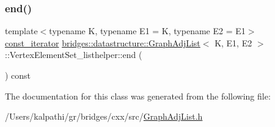 \mbox{\label{classbridges_1_1datastructure_1_1_graph_adj_list_1_1_vertex_element_set__listhelper_ade98a69d94c58ec30a24f0ed802fe672}} 
\subsubsection{\texorpdfstring{end()}{end()}\hspace{0.1cm}{\footnotesize\ttfamily [2/2]}}
{\footnotesize\ttfamily template$<$typename K, typename E1 = K, typename E2 = E1$>$ \\
\mbox{\hyperlink{classbridges_1_1datastructure_1_1_graph_adj_list_1_1_vertex_element_set__listhelper_1_1const__iterator}{const\+\_\+iterator}} \mbox{\hyperlink{classbridges_1_1datastructure_1_1_graph_adj_list}{bridges\+::datastructure\+::\+Graph\+Adj\+List}}$<$ K, E1, E2 $>$\+::Vertex\+Element\+Set\+\_\+listhelper\+::end (\begin{DoxyParamCaption}{ }\end{DoxyParamCaption}) const\hspace{0.3cm}{\ttfamily [inline]}}



The documentation for this class was generated from the following file\+:\begin{DoxyCompactItemize}
\item 
/\+Users/kalpathi/gr/bridges/cxx/src/\mbox{\hyperlink{_graph_adj_list_8h}{Graph\+Adj\+List.\+h}}\end{DoxyCompactItemize}
